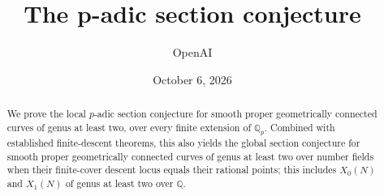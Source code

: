\documentclass[11pt]{article}
\title{The p-adic section conjecture}
\author{OpenAI}
\date{October 6, 2026}
\numberwithin{equation}{section}
\theoremstyle{remark}
\begin{document}
\maketitle
\begin{abstract}
We prove the local $p$-adic section conjecture for smooth proper
geometrically connected curves of genus at least two, over every finite
extension of $\mathbb Q_p$.
Combined with established finite-descent theorems, this also yields the
global section conjecture for smooth proper geometrically connected
curves of genus at least two over number fields when their finite-cover
descent locus equals their rational points; this includes $X_0(N)$ and
$X_1(N)$ of genus at least two over $\mathbb Q$.
\end{abstract}
\tableofcontents








\begingroup
\raggedright


\endgroup
\end{document}
